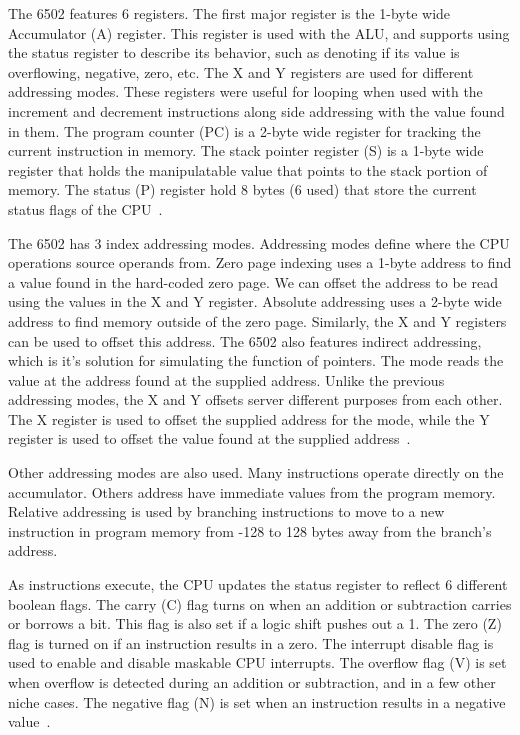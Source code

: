 \documentclass[12pt]{article}
\begin{document}
The 6502 features 6 registers. The first major register is the 1-byte wide Accumulator (A) register.
This register is used with the ALU, and supports using the status register to describe its behavior,
such as denoting if its value is overflowing, negative, zero, etc. The X and Y registers are used for
different addressing modes. These registers were useful for looping when used with the increment and 
decrement instructions along side addressing with the value found in them. The program counter (PC) is a 
 2-byte wide register for tracking the current instruction in memory. The stack pointer register (S) is a 
1-byte wide register that holds the manipulatable value that points to the stack portion of memory. The
status (P) register hold 8 bytes (6 used) that store the current status flags of the CPU~\cite{cpu_registers}.

The 6502 has 3 index addressing modes. Addressing modes define where the CPU operations source operands
from. Zero page indexing uses a 1-byte address to find a value found in the hard-coded zero page.
We can offset the address to be read using the values in the X and Y register. Absolute addressing 
uses a 2-byte wide address to find memory outside of the zero page. Similarly, the X and Y registers
can be used to offset this address. The 6502 also features indirect addressing, which is it's solution
for simulating the function of pointers. The mode reads the value at the address found at the supplied
address. Unlike the previous addressing modes, the X and Y offsets server different purposes from
each other. The X register is used to offset the supplied address for the mode, while the Y register
is used to offset the value found at the supplied address~\cite{addressing_modes}.

Other addressing modes are also used. Many instructions operate directly on the accumulator. Others address
have immediate values from the program memory. Relative addressing is used by branching instructions
to move to a new instruction in program memory from -128 to 128 bytes away from the branch's address.

As instructions execute, the CPU updates the status register to reflect 6 different boolean flags. The
carry (C) flag turns on when an addition or subtraction carries or borrows a bit. This flag is also set if
a logic shift pushes out a 1.
The zero (Z) flag is turned on if an instruction results in a zero. The interrupt disable flag is used to enable and disable
maskable CPU interrupts. The overflow flag (V) is set when overflow is detected during an addition or subtraction,
and in a few other niche cases. The negative flag (N) is set when an instruction results in a negative value~\cite{status_flags}.
\end{document}
